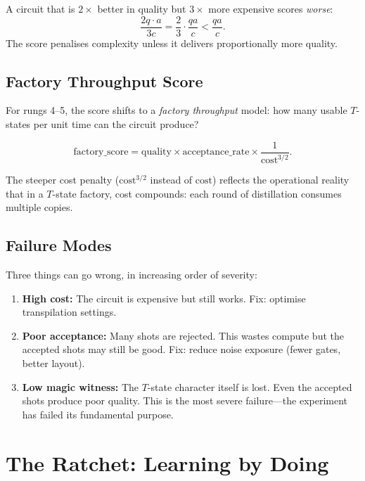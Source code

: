 \documentclass[11pt,a4paper,twoside]{report}
\theoremstyle{definition}
\begin{document}
\begin{example}[title={Score Tension}]
A circuit that is $2\times$ better in quality but $3\times$ more
expensive scores \emph{worse}:
\[
  \frac{2q \cdot a}{3c} = \frac{2}{3} \cdot \frac{qa}{c}
  < \frac{qa}{c}.
\]
The score penalises complexity unless it delivers proportionally more
quality.
\end{example}

\section{Factory Throughput Score}

For rungs 4--5, the score shifts to a \emph{factory throughput} model:
how many usable $T$-states per unit time can the circuit produce?

\begin{equation}
  \text{factory\_score} = \text{quality} \times \text{acceptance\_rate}
  \times \frac{1}{\text{cost}^{3/2}}.
\end{equation}

The steeper cost penalty ($\text{cost}^{3/2}$ instead of $\text{cost}$)
reflects the operational reality that in a $T$-state factory, cost
compounds: each round of distillation consumes multiple copies.

\section{Failure Modes}
\label{sec:failures}

Three things can go wrong, in increasing order of severity:

\begin{enumerate}
  \item \textbf{High cost:} The circuit is expensive but still works.
        Fix: optimise transpilation settings.
  \item \textbf{Poor acceptance:} Many shots are rejected. This wastes
        compute but the accepted shots may still be good. Fix: reduce
        noise exposure (fewer gates, better layout).
  \item \textbf{Low magic witness:} The $T$-state character itself is
        lost. Even the accepted shots produce poor quality. This is the
        most severe failure---the experiment has failed its fundamental
        purpose.
\end{enumerate}

\chapter{The Ratchet: Learning by Doing}
\label{ch:ratchet}
\end{document}
